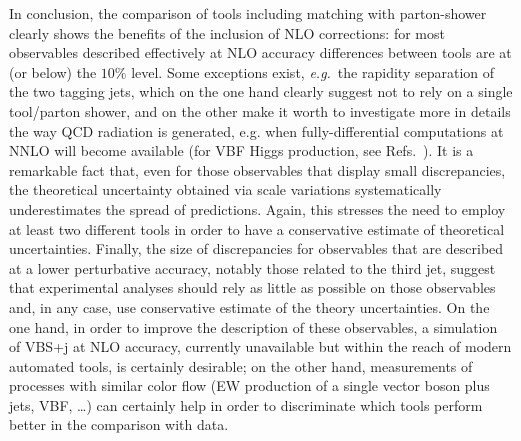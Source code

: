 In conclusion, the comparison of tools including matching with parton-shower clearly shows the benefits of the inclusion of NLO corrections: for most observables described
effectively at NLO accuracy differences between tools are at (or below) the $10\%$ level. 
Some exceptions exist, \emph{e.g.}\ the rapidity separation of the two tagging jets, which
on the one hand clearly suggest not to rely on a single tool/parton shower, and on the other make it worth to investigate more in details the way QCD radiation is
generated, e.g. when fully-differential computations at NNLO will become available (for VBF Higgs production, see Refs.~\cite{Cacciari:2015jma, Cruz-Martinez:2018rod}). It is a remarkable fact that, even for those observables that display small discrepancies,
the theoretical uncertainty obtained via scale variations systematically underestimates the spread of predictions. Again, this stresses the need
 to employ at least two different tools in order to have a conservative estimate of theoretical uncertainties. Finally, the size of discrepancies for observables that are described at a lower perturbative accuracy, notably those related to the third jet, suggest that
experimental analyses should rely as little as possible on those observables and, in any case, use conservative estimate of the theory 
uncertainties. On the one hand, in order to improve the
description of these observables, a simulation of VBS+j at NLO accuracy, currently unavailable but within the reach of modern 
automated tools, is certainly desirable; on the other hand, measurements of processes with similar 
color flow (EW production of a single vector boson plus jets,
 VBF, \ldots) can certainly help in order to discriminate which tools perform better in the comparison with data. 

